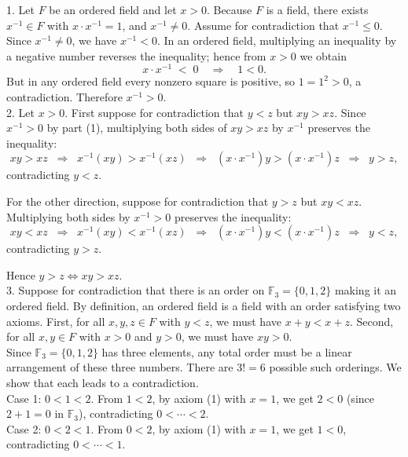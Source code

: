 \documentclass{report}
\begin{document}
\begin{proofWithHibiscus}
  1. Let $F$ be an ordered field and let $x>0$. Because $F$ is a field, there exists
  $x^{-1}\in F$ with $x\cdot x^{-1}=1$, and $x^{-1}\neq 0$.
  Assume for contradiction that $x^{-1}\le 0$. Since $x^{-1}\neq 0$, we have $x^{-1}<0$.
  In an ordered field, multiplying an inequality by a negative number reverses the
  inequality; hence from $x>0$ we obtain
  \[
  x\cdot x^{-1} \;<\; 0 \quad\Longrightarrow\quad 1<0.
  \]
  But in any ordered field every nonzero square is positive, so $1=1^2>0$, a contradiction.
  Therefore $x^{-1}>0$. \\

  2. Let $x>0$. First suppose for contradiction that $y<z$ but $xy > xz$.  
  Since $x^{-1}>0$ by part (1), multiplying both sides of $xy > xz$ by $x^{-1}$ preserves the inequality:
  \[
  xy > xz \;\;\Rightarrow\;\; x^{-1}(xy) > x^{-1}(xz) 
  \;\;\Rightarrow\;\; (x \cdot x^{-1})y > (x \cdot x^{-1})z
  \;\;\Rightarrow\;\; y > z,
  \]
  contradicting $y<z$.
  
  For the other direction, suppose for contradiction that $y>z$ but $xy < xz$. Multiplying both sides by $x^{-1}>0$ preserves the inequality:
  \[
  xy < xz \;\;\Rightarrow\;\; x^{-1}(xy) < x^{-1}(xz)
  \;\;\Rightarrow\;\; (x \cdot x^{-1})y < (x \cdot x^{-1})z
  \;\;\Rightarrow\;\; y < z,
  \]
  contradicting $y>z$.
  
  Hence $y>z \iff xy > xz$. \\

  3. Suppose for contradiction that there is an order on $\mathbb{F}_3=\{0,1,2\}$ 
  making it an ordered field. By definition, an ordered field is a field with an order 
  satisfying two axioms. First, for all $x,y,z \in F$ with $y<z$, we must have 
  $x+y<x+z$. Second, for all $x,y \in F$ with $x>0$ and $y>0$, we must have $xy>0$. \\
  
  
  Since $\mathbb{F}_3=\{0,1,2\}$ has three elements, any total order must be a linear arrangement of these three numbers. There are $3!=6$ possible such orderings.  We show that each leads to a contradiction.  \\
  
  Case 1: $0<1<2$.  
  From $1<2$, by axiom (1) with $x=1$, we get $2<0$ (since $2+1=0$ in $\mathbb{F}_3$), 
  contradicting $0<\cdots<2$. \\
  
  Case 2: $0<2<1$.  
  From $0<2$, by axiom (1) with $x=1$, we get $1<0$, contradicting $0<\cdots<1$.  \\
  

\end{proofWithHibiscus}
\end{document}
